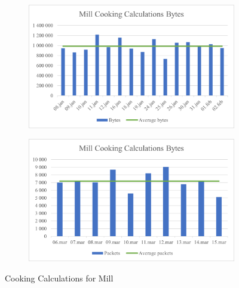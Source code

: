 \begin{figure}[H]
    \centering
    \begin{subfigure}{0.49\textwidth}
        \centering
        \includegraphics[width=1\hsize]{figures/Mill_Cooking_Calculations_Bytes.png} 
    \end{subfigure}
    \begin{subfigure}{0.49\textwidth}
        \centering
        \includegraphics[width=1\hsize]{figures/Mill_Cooking_Calculations_Packets.png} 
    \end{subfigure}
    \caption{Cooking Calculations for Mill}
    \label{fig:MillComparingCookingCalculations}
\end{figure}

